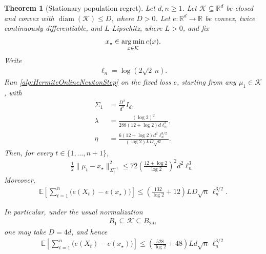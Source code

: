 \documentclass{article}
\theoremstyle{plain}
\newtheorem{theorem}{Theorem}
\theoremstyle{definition}
\theoremstyle{plain}
\newcommand{\R}{\mathbb R}
\newcommand{\argmin}{\operatornamewithlimits{arg\,min}}
\newcommand{\E}{\mathbb E}
\newcommand{\cK}{\mathcal K}
\begin{document}
\begin{theorem}[Stationary population regret]
    \label{thm:hermite-ons:stationary}
    Let $d,n\geq1$. Let $\cK\subseteq\R^d$ be closed and convex with
    $\operatorname{diam}(\cK)\leq D$, where $D>0$. Let
    $e:\R^d\to\R$ be convex, twice continuously differentiable, and
    $L$-Lipschitz, where $L>0$, and fix
    \begin{align}
        x_\star\in\argmin_{x\in\cK}e(x).
    \end{align}
    Write
    \begin{align}
        \ell_n=\log(2\sqrt2\,n).
    \end{align}
    Run \cref{alg:HermiteOnlineNewtonStep} on the fixed loss $e$,
    starting from any $\mu_1\in\cK$, with
    \begin{align}
        \Sigma_1
         & =
        \frac{D^2}{d^2}I_d,
        \label{eq:hermite-ons:stationary-sigma}
        \\
        \lambda
         & =
        \frac{(\log2)^2}
        {288(12+\log2)d\ell_n^2},
        \label{eq:hermite-ons:stationary-lambda}
        \\
        \eta
         & =
        \frac{
            6(12+\log2)d^2\ell_n^{3/2}
        }{
            (\log2)LD\sqrt n
        }.
        \label{eq:hermite-ons:stationary-eta}
    \end{align}
    Then, for every $t\in\{1,\ldots,n+1\}$,
    \begin{align}
        \frac12
        \|\mu_t-x_\star\|_{\Sigma_t^{-1}}^2
        \leq
        72
        \left(
        \frac{12+\log2}{\log2}
        \right)^2
        d^2\ell_n^3.
        \label{eq:hermite-ons:stationary-focus}
    \end{align}
    Moreover,
    \begin{align}
        \E\left[
            \sum_{t=1}^n
            \bigl(e(X_t)-e(x_\star)\bigr)
            \right]
        \leq
        \left(
        \frac{132}{\log2}+12
        \right)
        LD\sqrt n\,\ell_n^{3/2}.
        \label{eq:hermite-ons:stationary-regret}
    \end{align}

    In particular, under the usual normalization
    \begin{align}
        B_1\subseteq\cK\subseteq B_{2d},
    \end{align}
    one may take $D=4d$, and hence
    \begin{align}
        \E\left[
            \sum_{t=1}^n
            \bigl(e(X_t)-e(x_\star)\bigr)
            \right]
        \leq
        \left(
        \frac{528}{\log2}+48
        \right)
        Ld\sqrt n\,\ell_n^{3/2}
        \label{eq:hermite-ons:stationary-regret-normalized}
    \end{align}
\end{theorem}
\end{document}
